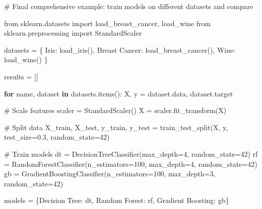 \documentclass[
  letterpaper,
  DIV=11,
  numbers=noendperiod]{scrreprt}
\newenvironment{Shaded}{\begin{snugshade}}{\end{snugshade}}
\newcommand{\CommentTok}[1]{\textcolor[rgb]{0.37,0.37,0.37}{#1}}
\newcommand{\ControlFlowTok}[1]{\textcolor[rgb]{0.00,0.23,0.31}{\textbf{#1}}}
\newcommand{\DecValTok}[1]{\textcolor[rgb]{0.68,0.00,0.00}{#1}}
\newcommand{\FloatTok}[1]{\textcolor[rgb]{0.68,0.00,0.00}{#1}}
\newcommand{\ImportTok}[1]{\textcolor[rgb]{0.00,0.46,0.62}{#1}}
\newcommand{\KeywordTok}[1]{\textcolor[rgb]{0.00,0.23,0.31}{\textbf{#1}}}
\newcommand{\NormalTok}[1]{\textcolor[rgb]{0.00,0.23,0.31}{#1}}
\newcommand{\OperatorTok}[1]{\textcolor[rgb]{0.37,0.37,0.37}{#1}}
\newcommand{\StringTok}[1]{\textcolor[rgb]{0.13,0.47,0.30}{#1}}
\begin{document}
\begin{Shaded}
\begin{Highlighting}[]
\CommentTok{\# Final comprehensive example: train models on different datasets and compare}

\ImportTok{from}\NormalTok{ sklearn.datasets }\ImportTok{import}\NormalTok{ load\_breast\_cancer, load\_wine}
\ImportTok{from}\NormalTok{ sklearn.preprocessing }\ImportTok{import}\NormalTok{ StandardScaler}

\NormalTok{datasets }\OperatorTok{=}\NormalTok{ \{}
    \StringTok{\textquotesingle{}Iris\textquotesingle{}}\NormalTok{: load\_iris(),}
    \StringTok{\textquotesingle{}Breast Cancer\textquotesingle{}}\NormalTok{: load\_breast\_cancer(),}
    \StringTok{\textquotesingle{}Wine\textquotesingle{}}\NormalTok{: load\_wine()}
\NormalTok{\}}

\NormalTok{results }\OperatorTok{=}\NormalTok{ []}

\ControlFlowTok{for}\NormalTok{ name, dataset }\KeywordTok{in}\NormalTok{ datasets.items():}
\NormalTok{    X, y }\OperatorTok{=}\NormalTok{ dataset.data, dataset.target}
    
    \CommentTok{\# Scale features}
\NormalTok{    scaler }\OperatorTok{=}\NormalTok{ StandardScaler()}
\NormalTok{    X }\OperatorTok{=}\NormalTok{ scaler.fit\_transform(X)}
    
    \CommentTok{\# Split data}
\NormalTok{    X\_train, X\_test, y\_train, y\_test }\OperatorTok{=}\NormalTok{ train\_test\_split(X, y, test\_size}\OperatorTok{=}\FloatTok{0.3}\NormalTok{, random\_state}\OperatorTok{=}\DecValTok{42}\NormalTok{)}
    
    \CommentTok{\# Train models}
\NormalTok{    dt }\OperatorTok{=}\NormalTok{ DecisionTreeClassifier(max\_depth}\OperatorTok{=}\DecValTok{4}\NormalTok{, random\_state}\OperatorTok{=}\DecValTok{42}\NormalTok{)}
\NormalTok{    rf }\OperatorTok{=}\NormalTok{ RandomForestClassifier(n\_estimators}\OperatorTok{=}\DecValTok{100}\NormalTok{, max\_depth}\OperatorTok{=}\DecValTok{4}\NormalTok{, random\_state}\OperatorTok{=}\DecValTok{42}\NormalTok{)}
\NormalTok{    gb }\OperatorTok{=}\NormalTok{ GradientBoostingClassifier(n\_estimators}\OperatorTok{=}\DecValTok{100}\NormalTok{, max\_depth}\OperatorTok{=}\DecValTok{3}\NormalTok{, random\_state}\OperatorTok{=}\DecValTok{42}\NormalTok{)}
    
\NormalTok{    models }\OperatorTok{=}\NormalTok{ \{}\StringTok{\textquotesingle{}Decision Tree\textquotesingle{}}\NormalTok{: dt, }\StringTok{\textquotesingle{}Random Forest\textquotesingle{}}\NormalTok{: rf, }\StringTok{\textquotesingle{}Gradient Boosting\textquotesingle{}}\NormalTok{: gb\}}
    

\end{Highlighting}
\end{Shaded}
\end{document}
